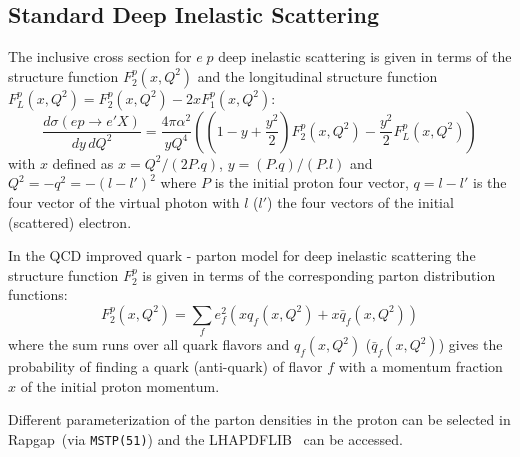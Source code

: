 \documentclass[10pt]{article} \usepackage{dina4}
\newcommand{\LHAPDFLIB}{Whalley:2005nh}
\def\RAPGAP{{\sc Rapgap}}
\begin{document}
\subsection{Standard Deep Inelastic Scattering}
The inclusive cross section for $e\;p$ deep inelastic scattering is given
in terms of the structure function $F_2^p(x,Q^2)$ and the 
longitudinal structure function 
$F_L^p(x,Q^2) = F_2^p(x,Q^2) - 2 x F_1^p(x,Q^2)$:
\begin{equation}
\frac{d \sigma (e p \to e' X)}{dy\,dQ^2}
= \frac{4 \pi \alpha ^2}{y Q^4} 
         \left(  \left( 1 -  y + \frac{y^2}{2} \right)  F_2^p(x,Q^2)
                   -   \frac{y^2}{2} F_L^p(x,Q^2) \right)
\end{equation}
with $x$ defined as $x = Q^2/(2P.q)$, $y=(P.q)/(P.l)$ 
and 
$Q^2 = -q^2 = - (l - l')^2$ where $P$ is the initial proton
four vector, $q = l - l'$ is the four vector of the virtual photon
with $l$ ($l'$)  the four vectors of the initial 
(scattered) electron.
\par
In the QCD improved  quark - parton model for
deep inelastic scattering the structure function
$F_2^p$ is given in terms of the corresponding parton distribution
functions:
\begin{equation}
F_2^p(x,Q^2) = \sum_f e^2_f \left( xq_f(x,Q^2) + x\bar{q}_f(x,Q^2)
                    \right)
\end{equation}
where the sum runs over all quark flavors and $q_f(x,Q^2)$
($\bar{q}_f(x,Q^2)$) gives the
probability of finding a quark (anti-quark) 
of flavor $f$ with a momentum fraction $x$ 
of the initial proton momentum.
\par
Different parameterization of the
parton densities in the proton can be selected in \RAPGAP\ 
(via \verb+MSTP(51)+) and the LHAPDFLIB~\cite{\LHAPDFLIB} can be accessed. 
\end{document}
